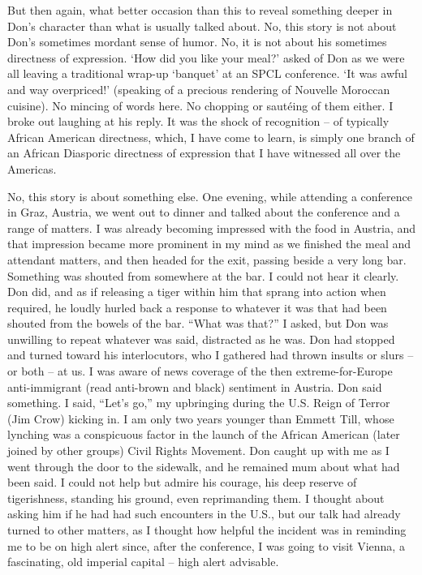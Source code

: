 \documentclass[output=paper, colorlinks,citecolor=brown]{langscibook}
\begin{document}
But then again, what better occasion than this to reveal something deeper in Don’s character than what is usually talked about. No, this story is not about Don’s sometimes mordant sense of humor. No, it is not about his sometimes directness of expression. ‘How did you like your meal?’ asked of Don as we were all leaving a traditional wrap-up ‘banquet’ at an SPCL conference. ‘It was awful and way overpriced!’ (speaking of a precious rendering of Nouvelle Moroccan cuisine). No mincing of words here. No chopping or sautéing of them either. I broke out laughing at his reply. It was the shock of recognition -- of typically African American directness, which, I have come to learn, is simply one branch of an African Diasporic directness of expression that I have witnessed all over the Americas. 

No, this story is about something else. One evening, while attending a conference in Graz, Austria, we went out to dinner and talked about the conference and a range of matters. I was already becoming impressed with the food in Austria, and that impression became more prominent in my mind as we finished the meal and attendant matters, and then headed for the exit, passing beside a very long bar. Something was shouted from somewhere at the bar. I could not hear it clearly. Don did, and as if releasing a tiger within him that sprang into action when required, he loudly hurled back a response to whatever it was that had been shouted from the bowels of the bar. “What was that?” I asked, but Don was unwilling to repeat whatever was said, distracted as he was. Don had stopped and turned toward his interlocutors, who I gathered had thrown insults or slurs -- or both -- at us. I was aware of news coverage of the then extreme-for-Europe anti-immigrant (read anti-brown and black) sentiment in Austria. Don said something. I said, “Let’s go,” my upbringing during the U.S. Reign of Terror (Jim Crow) kicking in. I am only two years younger than Emmett Till, whose lynching was a conspicuous factor in the launch of the African American (later joined by other groups) Civil Rights Movement. Don caught up with me as I went through the door to the sidewalk, and he remained mum about what had been said. I could not help but admire his courage, his deep reserve of tigerishness, standing his ground, even reprimanding them. I thought about asking him if he had had such encounters in the U.S., but our talk had already turned to other matters, as I thought how helpful the incident was in reminding me to be on high alert since, after the conference, I was going to visit Vienna, a fascinating, old imperial capital -- high alert advisable.
\end{document}
